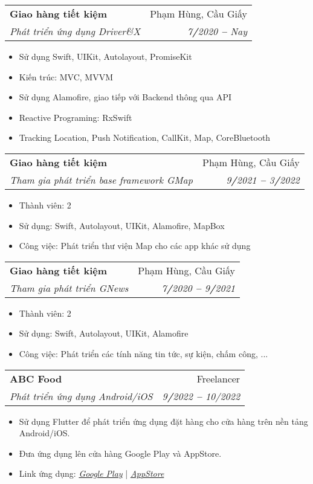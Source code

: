 \documentclass[letterpaper,11pt]{article}
\makeatletter
\newcommand{\resumeItem}[1]{
  \item\small{
    {#1 \vspace{-2pt}}
  }
}
\newcommand{\resumeSubheading}[4]{
  \vspace{-2pt}\item
    \begin{tabular*}{0.97\textwidth}[t]{l@{\extracolsep{\fill}}r}
      \textbf{#1} & #2 \\
      \textit{\small#3} & \textit{\small #4} \\
    \end{tabular*}\vspace{-7pt}
}
\newcommand{\resumeItemListStart}{\begin{itemize}}
\newcommand{\resumeItemListEnd}{\end{itemize}\vspace{-5pt}}
\makeatother
\begin{document}
    \resumeSubheading
      {Giao hàng tiết kiệm}{Phạm Hùng, Cầu Giấy}
      {Phát triển ứng dụng Driver\&X}{7\textbf{/}2020 \textbf{--} Nay}
        \resumeItemListStart
            \resumeItem{Sử dụng Swift, UIKit, Autolayout, PromiseKit}
            \resumeItem{Kiến trúc: MVC, MVVM}
            \resumeItem{Sử dụng Alamofire, giao tiếp với Backend thông qua API}
            \resumeItem{Reactive Programing: RxSwift}
            \resumeItem{Tracking Location, Push Notification, CallKit, Map, CoreBluetooth}
        \resumeItemListEnd
        
    \resumeSubheading
        {Giao hàng tiết kiệm}{Phạm Hùng, Cầu Giấy}
        {Tham gia phát triển base framework GMap}{9\textbf{/}2021 \textbf{--} 3\textbf{/}2022}
        \resumeItemListStart
            \resumeItem{Thành viên: 2}
            \resumeItem{Sử dụng: Swift, Autolayout, UIKit, Alamofire, MapBox}
            \resumeItem{Công việc: Phát triển thư viện Map cho các app khác sử dụng}
        \resumeItemListEnd
        
    \resumeSubheading
        {Giao hàng tiết kiệm}{Phạm Hùng, Cầu Giấy}
        {Tham gia phát triển GNews}{7\textbf{/}2020 \textbf{--} 9\textbf{/}2021}
        \resumeItemListStart
            \resumeItem{Thành viên: 2}
            \resumeItem{Sử dụng: Swift, Autolayout, UIKit, Alamofire}
            \resumeItem{Công việc: Phát triển các tính năng tin tức, sự kiện, chấm công, ...}
        \resumeItemListEnd
        
    \resumeSubheading
      {ABC Food}{Freelancer}
      {Phát triển ứng dụng Android/iOS}{9\textbf{/}2022 \textbf{--} 10/2022}
        \resumeItemListStart
            \resumeItem{Sử dụng Flutter để phát triển ứng dụng đặt hàng cho cửa hàng trên nền tảng Android/iOS.}
            \resumeItem{Đưa ứng dụng lên cửa hàng Google Play và AppStore.}
            \resumeItem{Link ứng dụng: \emph{\href{https://play.google.com/store/apps/details?id=com.abcfood.abcfood}{\color{blue}Google Play}} | \emph{\href{https://apps.apple.com/app/id6443708922}{\color{blue}AppStore}}}
            
    \resumeItemListEnd
    
\end{document}
